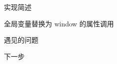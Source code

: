 \documentclass[presentation]{beamer}
\begin{document}
\begin{frame}[label=sec-6]{实现简述}
\begin{block}{全局变量替换为 window 的属性调用}
\end{block}
\end{frame}
\begin{frame}[label=sec-7]{遇见的问题}
\end{frame}
\begin{frame}[label=sec-8]{下一步}
\end{frame}
\end{document}
